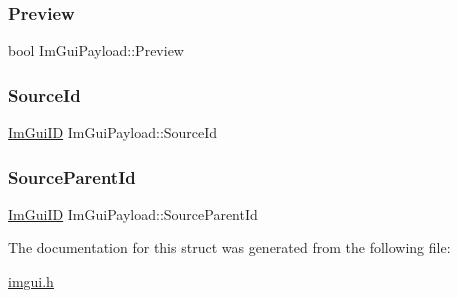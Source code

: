 \mbox{\label{struct_im_gui_payload_a1a5b6456247ef3c213f0706cc9da16e6}} 
\subsubsection{\texorpdfstring{Preview}{Preview}}
{\footnotesize\ttfamily bool Im\+Gui\+Payload\+::\+Preview}

\mbox{\label{struct_im_gui_payload_aa574f7e237c6d2172977d142b25c0111}} 
\subsubsection{\texorpdfstring{Source\+Id}{SourceId}}
{\footnotesize\ttfamily \mbox{\hyperlink{imgui_8h_a1785c9b6f4e16406764a85f32582236f}{Im\+Gui\+ID}} Im\+Gui\+Payload\+::\+Source\+Id}

\mbox{\label{struct_im_gui_payload_a1757c714dd47f09b645a8eba2912849d}} 
\subsubsection{\texorpdfstring{Source\+Parent\+Id}{SourceParentId}}
{\footnotesize\ttfamily \mbox{\hyperlink{imgui_8h_a1785c9b6f4e16406764a85f32582236f}{Im\+Gui\+ID}} Im\+Gui\+Payload\+::\+Source\+Parent\+Id}



The documentation for this struct was generated from the following file\+:\begin{DoxyCompactItemize}
\item 
\mbox{\hyperlink{imgui_8h}{imgui.\+h}}\end{DoxyCompactItemize}
